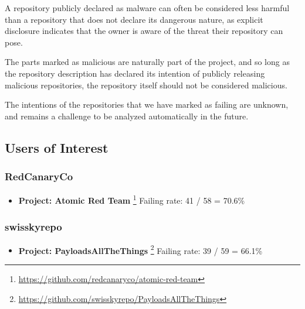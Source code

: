 \documentclass[]{acmart}
\begin{document}
A repository publicly declared as malware can often be considered less harmful than a repository that does not declare its dangerous nature, as explicit disclosure indicates that the owner is aware of the threat their repository can pose.

The parts marked as malicious are naturally part of the project, and so long as the repository description has declared its intention of publicly releasing malicious repositories, the repository itself should not be considered malicious. 

The intentions of the repositories that we have marked as failing are unknown, and remains a challenge to be analyzed automatically in the future. 

\subsection{Users of Interest}
\subsubsection{RedCanaryCo} 
\begin{itemize}
    \item { \bf Project: Atomic Red Team }\footnote{\url{https://github.com/redcanaryco/atomic-red-team}} Failing rate: 41 / 58 = 70.6\%
\end{itemize}

\subsubsection{swisskyrepo}
\begin{itemize}
    \item { \bf Project: PayloadsAllTheThings } \footnote{\url{https://github.com/swisskyrepo/PayloadsAllTheThings}} 
    Failing rate: 39 / 59 = 66.1\%
\end{itemize}
\end{document}
